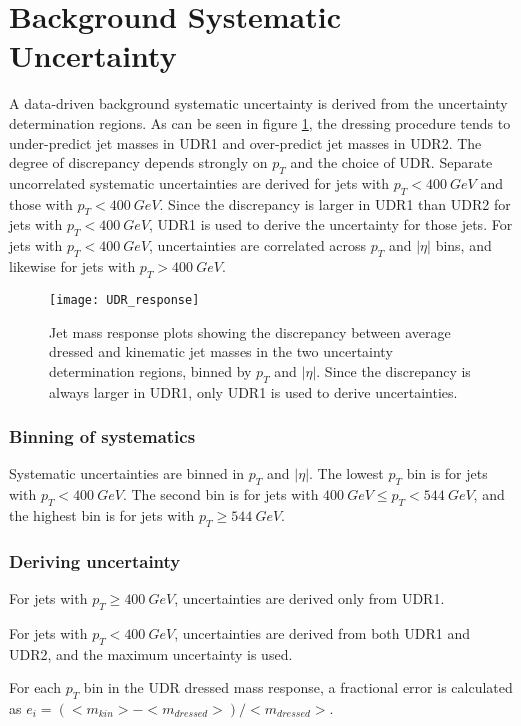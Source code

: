 \section{Background Systematic Uncertainty} \label{bkg_uncert}
A data-driven background systematic uncertainty is derived from the
uncertainty determination regions. As can be seen in figure
\ref{fig:udr_response}, the dressing procedure tends to under-predict
jet masses in UDR1 and over-predict jet masses in UDR2. The degree of
discrepancy depends strongly on $p_T$ and the choice of UDR. Separate uncorrelated systematic uncertainties are derived
for jets with $p_T<400~GeV$ and those with $p_T<400~GeV$. Since the
discrepancy is larger in UDR1 than UDR2 for jets with $p_T<400~GeV$,
UDR1 is used to derive the uncertainty for those jets. For jets with
$p_T<400~GeV$, uncertainties are correlated across $p_T$ and $|\eta|$
bins, and likewise for jets with $p_T>400~GeV$.

\begin{figure}[h]
\texttt{[image: UDR\_response]}
\caption{Jet mass response plots showing the discrepancy between
  average dressed and kinematic jet masses in the two uncertainty
  determination regions, binned by $p_T$ and $|\eta|$. Since the
  discrepancy is always larger in UDR1, only UDR1 is used to derive
  uncertainties.}
\label{fig:udr_response}
\end{figure}

\subsubsection{Binning of systematics}
Systematic uncertainties are binned in $p_{T}$ and $|\eta|$. The lowest
$p_{T}$ bin is for jets with $p_{T} < 400~GeV$. The second bin is for
jets with $400~GeV \leq p_T
< 544~GeV$, and the highest bin is for jets with $p_T \geq 544~GeV$.

\subsubsection{Deriving uncertainty}
For jets with $p_{T} \geq 400~GeV$, uncertainties are derived only
from UDR1.

For jets with $p_{T} < 400~GeV$, uncertainties are derived from both
UDR1 and UDR2, and the maximum uncertainty is used.

For each $p_T$ bin in the UDR dressed mass response, a fractional
error is calculated as
$e_i=\left(<m_{kin}>-<m_{dressed}>\right)/<m_{dressed}>$.

